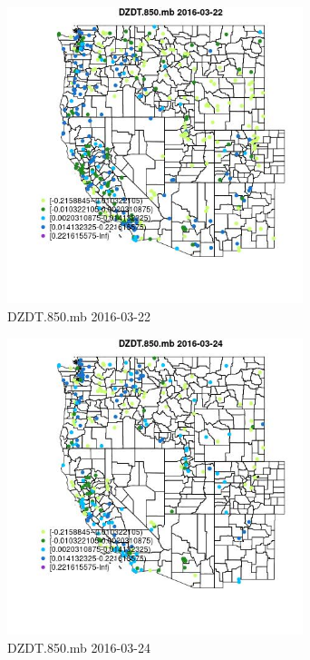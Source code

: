 \begin{figure} 
\centering  
\includegraphics[width=0.77\textwidth]{Code_Outputs/Report_ML_input_PM25_Step4_part_e_de_duplicated_aveswNAs_MapObsDZDT850mb2016-03-22.jpg} 
\caption{\label{fig:Report_ML_input_PM25_Step4_part_e_de_duplicated_aveswNAsMapObsDZDT850mb2016-03-22}DZDT.850.mb 2016-03-22} 
\end{figure} 
 

\begin{figure} 
\centering  
\includegraphics[width=0.77\textwidth]{Code_Outputs/Report_ML_input_PM25_Step4_part_e_de_duplicated_aveswNAs_MapObsDZDT850mb2016-03-24.jpg} 
\caption{\label{fig:Report_ML_input_PM25_Step4_part_e_de_duplicated_aveswNAsMapObsDZDT850mb2016-03-24}DZDT.850.mb 2016-03-24} 
\end{figure} 
 

